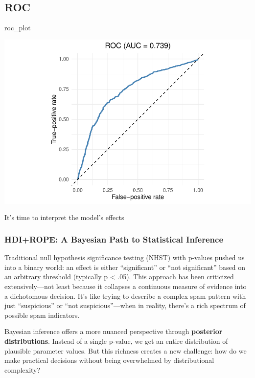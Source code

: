 \documentclass[
  letterpaper,
  DIV=11,
  numbers=noendperiod]{scrartcl}
\newenvironment{Shaded}{\begin{snugshade}}{\end{snugshade}}
\newcommand{\NormalTok}[1]{\textcolor[rgb]{0.00,0.23,0.31}{#1}}
\begin{document}
\subsection{ROC}

\begin{Shaded}
\begin{Highlighting}[]
\NormalTok{roc\_plot}
\end{Highlighting}
\end{Shaded}

\begin{center}
\includegraphics[width=0.8\linewidth,height=\textheight,keepaspectratio]{Beyond!!!_files/figure-pdf/unnamed-chunk-9-1.pdf}
\end{center}

It's time to interpret the model's effects

\subsubsection{HDI+ROPE: A Bayesian Path to Statistical
Inference}\label{hdirope-a-bayesian-path-to-statistical-inference}

Traditional null hypothesis significance testing (NHST) with p-values
pushed us into a binary world: an effect is either ``significant'' or
``not significant'' based on an arbitrary threshold (typically p
\textless{} .05). This approach has been criticized extensively---not
least because it collapses a continuous measure of evidence into a
dichotomous decision. It's like trying to describe a complex spam
pattern with just ``suspicious'' or ``not suspicious''---when in
reality, there's a rich spectrum of possible spam indicators.

Bayesian inference offers a more nuanced perspective through
\textbf{posterior distributions}. Instead of a single p-value, we get an
entire distribution of plausible parameter values. But this richness
creates a new challenge: how do we make practical decisions without
being overwhelmed by distributional complexity?
\end{document}
